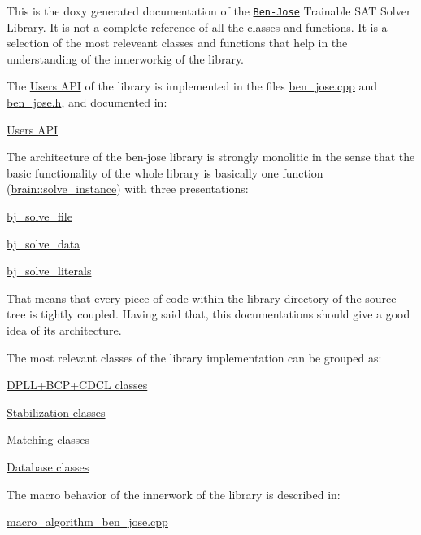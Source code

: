 This is the doxy generated documentation of the \href{https://github.com/joseluisquiroga/ben-jose}{\tt Ben-\/\+Jose} Trainable S\+AT Solver Library. It is not a complete reference of all the classes and functions. It is a selection of the most releveant classes and functions that help in the understanding of the innerworkig of the library.

The \hyperlink{group__docgrp___a_p_i}{User\textquotesingle{}s A\+PI} of the library is implemented in the files \hyperlink{ben__jose_8cpp}{ben\+\_\+jose.\+cpp} and \hyperlink{ben__jose_8h}{ben\+\_\+jose.\+h}, and documented in\+:


\begin{DoxyItemize}
\item \hyperlink{group__docgrp___a_p_i}{User\textquotesingle{}s A\+PI} 
\end{DoxyItemize}

The architecture of the ben-\/jose library is strongly monolitic in the sense that the basic functionality of the whole library is basically one function (\hyperlink{classbrain_a2daa8c1c03eea62a51a359470bb64cc7}{brain\+::solve\+\_\+instance}) with three presentations\+:


\begin{DoxyItemize}
\item \hyperlink{ben__jose_8h_a65eb23939cc4ae39654dbd93343580c8}{bj\+\_\+solve\+\_\+file} 
\item \hyperlink{ben__jose_8h_a45eef575a2ca6c6b90e0a1d998f1eb7d}{bj\+\_\+solve\+\_\+data} 
\item \hyperlink{ben__jose_8h_a2818f32df95b8d462f49a201ce371142}{bj\+\_\+solve\+\_\+literals} 
\end{DoxyItemize}

That means that every piece of code within the \textquotesingle{}library\textquotesingle{} directory of the source tree is tightly coupled. Having said that, this documentations should give a good idea of it\textquotesingle{}s architecture.

The most relevant classes of the library implementation can be grouped as\+:


\begin{DoxyItemize}
\item \hyperlink{group__docgrp___c_d_c_l__classes}{D\+P\+L\+L+\+B\+C\+P+\+C\+D\+CL classes} 
\item \hyperlink{group__docgrp__stab__classes}{Stabilization classes} 
\item \hyperlink{group__docgrp__matching__classes}{Matching classes} 
\item \hyperlink{group__docgrp__database__classes}{Database classes} 
\end{DoxyItemize}

The macro behavior of the innerwork of the library is described in\+:


\begin{DoxyItemize}
\item \hyperlink{macro__algorithm__ben__jose_8cpp}{macro\+\_\+algorithm\+\_\+ben\+\_\+jose.\+cpp} 
\end{DoxyItemize}